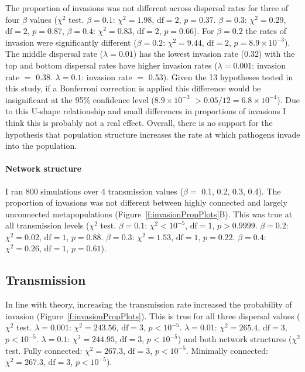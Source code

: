 The proportion of invasions was not different across dispersal rates for three of four $\beta$ values ($\chi^2$ test. $\beta = 0.1$: $\chi^2 = 1.98$, $\text{df} = 2$, $p = 0.37$.  $\beta = 0.3$: $\chi^2 = 0.29$, $\text{df} = 2$, $p = 0.87$, $\beta = 0.4$: $\chi^2 = 0.83$, $\text{df} = 2$, $p = 0.66$).
For $\beta = 0.2$ the rates of invasion were significantly different ($\beta = 0.2$: $\chi^2 = 9.44$, $\text{df} = 2$, $p = \ensuremath{8.9\times 10^{-3}}$).
The middle dispersal rate ($\lambda = 0.01$) has the lowest invasion rate (0.32) with the top and bottom dispersal rates have higher invasion rates ($\lambda = 0.001$: invasion rate $=$ 0.38. $\lambda = 0.1$: invasion rate $=$ 0.53).
Given the 13 hypotheses tested in this study, if a Bonferroni correction is applied this difference would be insignificant at the 95\% confidence level (\ensuremath{8.9\times 10^{-3}} $> 0.05 / 12 = 6.8 \times 10^{-4}$).
Due to this U-shape relationship and small differences in proportions of invasions I think this is probably not a real effect.
Overall, there is no support for the hypothesis that population structure increases the rate at which pathogens invade into the population.

\paragraph{Network structure}

I ran 800 simulations over 4 transmission values ($\beta = $ 0.1, 0.2, 0.3, 0.4).
The proportion of invasions was not different between highly connected and largely unconnected metapopulations (Figure~\ref{f:invasionPropPlots}B). 
This was true at all transmission levels ($\chi^2$ test. $\beta = 0.1$: $\chi^2 < 10^{-5}$, $\text{df} = 1$, $p > 0.9999$. $\beta = 0.2$: $\chi^2 = 0.02$, $\text{df} = 1$, $p = 0.88$. $\beta = 0.3$: $\chi^2 = 1.53$, $\text{df} = 1$, $p = 0.22$. $\beta = 0.4$: $\chi^2 = 0.26$, $\text{df} = 1$, $p = 0.61$).

 
\subsection{Transmission}

In line with theory, increasing the transmission rate increased the probability of invasion (Figure~\ref{f:invasionPropPlots}).
This is true for all three dispersal values ($\chi^2$ test. $\lambda = 0.001$: $\chi^2 = 243.56$, $\text{df} = 3$, $p < 10^{-5}$. $\lambda = 0.01$: $\chi^2 = 265.4$, $\text{df} = 3$, $p < 10^{-5}$. $\lambda = 0.1$: $\chi^2 = 244.95$, $\text{df} = 3$, $p < 10^{-5}$) and both network structures ($\chi^2$ test. Fully connected: $\chi^2 = 267.3$, $\text{df} = 3$, $p < 10^{-5}$. Minimally connected: $\chi^2 =  267.3$, $\text{df} = 3$, $p < 10^{-5}$).









